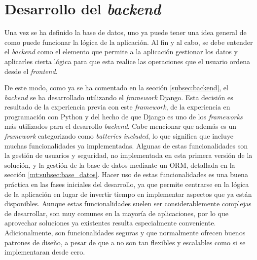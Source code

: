 \section{Desarrollo del \textit{backend}}
\label{dev:sec:desarrollo_backend}

Una vez se ha definido la base de datos, uno ya puede tener una idea general de como puede funcionar la lógica de la aplicación. Al fin y al cabo, se debe entender el \textit{backend} como el elemento que permite a la aplicación gestionar los datos y aplicarles cierta lógica para que esta realice las operaciones que el usuario ordena desde el \textit{frontend}.

De este modo, como ya se ha comentado en la sección \ref{subsec:backend}, el \textit{backend} se ha desarrollado utilizando el \textit{framework} Django. Esta decisión es resultado de la experiencia previa con este \textit{framework}, de la experiencia en programación con Python y del hecho de que Django es uno de los \textit{frameworks} más utilizados para el desarrollo \textit{backend}. Cabe mencionar que además es un \textit{framework} categorizado como \textit{batteries included}, lo que significa que incluye muchas funcionalidades ya implementadas. Algunas de estas funcionalidades son la gestión de usuarios y seguridad, no implementada en esta primera versión de la solución, y la gestión de la base de datos mediante un ORM, detallada en la sección \ref{mt:subsec:base_datos}. Hacer uso de estas funcionalidades es una buena práctica en las fases iniciales del desarrollo, ya que permite centrarse en la lógica de la aplicación en lugar de invertir tiempo en implementar aspectos que ya están disponibles. Aunque estas funcionalidades suelen ser considerablemente complejas de desarrollar, son muy comunes en la mayoría de aplicaciones, por lo que aprovechar soluciones ya existentes resulta especialmente conveniente. Adicionalmente, son funcionalidades seguras y que normalmente ofrecen buenos patrones de diseño, a pesar de que a no son tan flexibles y escalables como si se implementaran desde cero.

